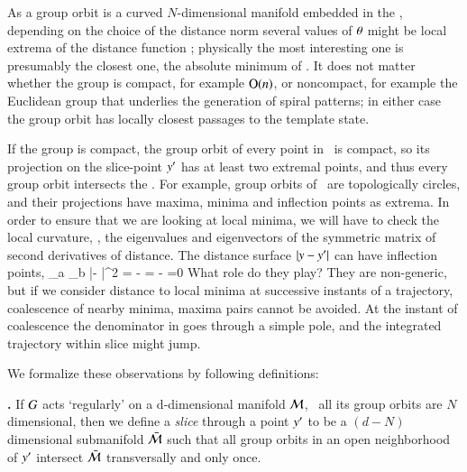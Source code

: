 As a group orbit is a curved $N$-dimensional manifold embedded in the \statesp, depending on the choice of the distance norm several values of ${\bf \theta}$ might be local extrema of the distance function ; physically the most interesting one is presumably the closest one, the absolute minimum of . It does not matter whether the group is compact, for example $\textrm{O}(n)$, or noncompact, for example the Euclidean group that underlies the generation of spiral patterns; in either case the group orbit has locally closest passages to the template state. 

If the group is compact, the group orbit of every point in \pS\ is compact, so its projection on the slice-point ${y'}$ has at least two extremal points, and thus every group orbit intersects the \slice. For example, group orbits of \ are topologically circles, and their projections have maxima, minima and inflection points as extrema.
In order to ensure that we are looking at local minima, we will have to check the local curvature, \ie, the eigenvalues and eigenvectors of the symmetric matrix of second derivatives of distance.
The distance surface $|y - {y'}|$
can have inflection points,
\beq
{}
     {\partial \gSpace_a \partial \gSpace_b}
        |\sspRed - \slicep|^2
    =
  - =
  - =0
What role do they play? They are non-generic, but if we consider distance to local minima at successive instants of a trajectory, coalescence of nearby minima, maxima pairs cannot be avoided. At the instant of coalescence the denominator in  goes through a simple pole, and the integrated trajectory within slice might jump.

We formalize these observations by following definitions:

\begin{definition}
\textbf{\Slice.}
If $G$ acts `regularly' on a d-dimensional manifold ${\cal M}$, \ie\ all its group orbits are $N$ dimensional, then we define a \emph{slice} through a point ${y'}$ to be a $(d\!-\!N)$ dimensional submanifold $\bar{\cal M}$ such that all group orbits in an open neighborhood of ${y'}$ intersect $\bar{\cal M}$ transversally and only once.
\end{definition}

